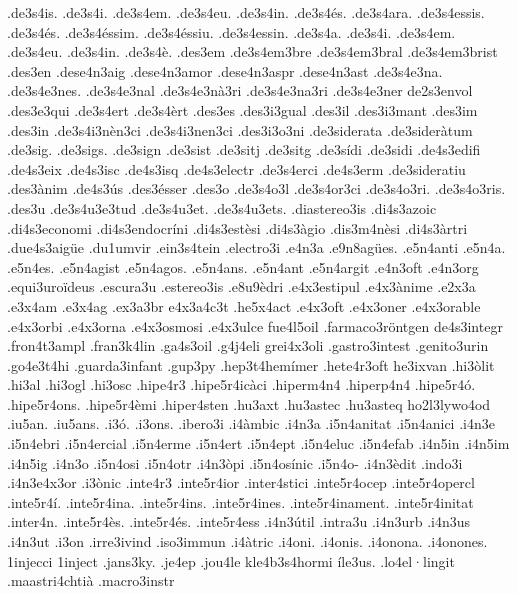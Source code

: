 {.de3s4is.
.de3s4i.
.de3s4em.
.de3s4eu.
.de3s4in.
.de3s4és.
.de3s4ara.
.de3s4essis.
.de3s4és.
.de3s4éssim.
.de3s4éssiu.
.de3s4essin.
.de3s4a.
.de3s4i.
.de3s4em.
.de3s4eu.
.de3s4in.
.de3s4è.
.des3em
.de3s4em3bre
.de3s4em3bral
.de3s4em3brist
.des3en
.dese4n3aig
.dese4n3amor
.dese4n3aspr
.dese4n3ast
.de3s4e3na.
.de3s4e3nes.
.de3s4e3nal
.de3s4e3nà3ri
.de3s4e3na3ri
.de3s4e3ner
de2s3envol
.des3e3qui
.de3s4ert
.de3s4èrt
.des3es
.des3i3gual
.des3il
.des3i3mant
.des3im
.des3in
.de3s4i3nèn3ci
.de3s4i3nen3ci
.des3i3o3ni
.de3siderata
.de3sideràtum
.de3sig.
.de3sigs.
.de3sign
.de3sist
.de3sitj
.de3sitg
.de3sídi
.de3sidi
.de4s3edifi
.de4s3eix
.de4s3isc
.de4s3isq
.de4s3electr
.de3s4erci
.de4s3erm
.de3sideratiu
.des3ànim
.de4s3ús
.des3ésser
.des3o
.de3s4o3l
.de3s4or3ci
.de3s4o3ri.
.de3s4o3ris.
.des3u
.de3s4u3e3tud
.de3s4u3et.
.de3s4u3ets.
.diastereo3is
.di4s3azoic
.di4s3economi
.di4s3endocríni
.di4s3estèsi
.di4s3àgio
.dis3m4nèsi
.di4s3àrtri
.due4s3aigüe
.du1umvir
.ein3s4tein
.electro3i
.e4n3a
.e9n8agües.
.e5n4anti
.e5n4a.
.e5n4es.
.e5n4agist
.e5n4agos.
.e5n4ans.
.e5n4ant
.e5n4argit
.e4n3oft
.e4n3org
.equi3uroïdeus
.escura3u
.estereo3is
.e8u9èdri
.e4x3estipul
.e4x3ànime
.e2x3a
.e3x4am
.e3x4ag
.ex3a3br
e4x3a4c3t
.he5x4act
.e4x3oft
.e4x3oner
.e4x3orable
.e4x3orbi
.e4x3orna
.e4x3osmosi
.e4x3ulce
fue4l5oil
.farmaco3röntgen
de4s3integr
.fron4t3ampl
.fran3k4lin
.ga4s3oil
.g4j4eli
grei4x3oli
.gastro3intest
.genito3urin
.go4e3t4hi
.guarda3infant
.gup3py
.hep3t4hemímer %
.hete4r3oft
he3ixvan
.hi3òlit
.hi3al
.hi3ogl
.hi3osc
.hipe4r3
.hipe5r4icàci
.hiperm4n4
.hiperp4n4
.hipe5r4ó.
.hipe5r4ons.
.hipe5r4èmi
.hiper4sten
.hu3axt
.hu3astec
.hu3asteq
ho2l3lywo4od
.iu5an.
.iu5ans.
.i3ó.
.i3ons.
.ibero3i
.i4àmbic
.i4n3a
.i5n4anitat
.i5n4anici 
.i4n3e
.i5n4ebri
.i5n4ercial
.i5n4erme
.i5n4ert
.i5n4ept
.i5n4eluc
.i5n4efab
.i4n5in
.i4n5im
.i4n5ig
.i4n3o
.i5n4osi
.i5n4otr
.i4n3òpi
.i5n4osínic
.i5n4o-
.i4n3èdit
.indo3i
.i4n3e4x3or
.i3ònic
.inte4r3
.inte5r4ior
.inter4stici
.inte5r4ocep
.inte5r4opercl
.inte5r4í.
.inte5r4ina.
.inte5r4ins.
.inte5r4ines.
.inte5r4inament.
.inte5r4initat
.inter4n.
.inte5r4ès.
.inte5r4és.
.inte5r4ess
.i4n3útil
.intra3u
.i4n3urb
.i4n3us
.i4n3ut
.i3on
.irre3ivind
.iso3immun
.i4àtric
.i4oni.
.i4onis.
.i4onona.
.i4onones.
1injecci
1inject
.jans3ky.
.je4ep
.jou4le
kle4b3s4hormi
íle3us.
.lo4el·lingit
.maastri4chtià
.macro3instr
}

